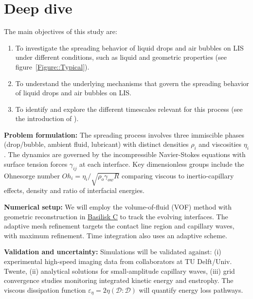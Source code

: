 \documentclass[11pt]{article}
\begin{document}
\section*{Deep dive}

The main objectives of this study are:

\begin{enumerate}
	\item To investigate the spreading behavior of liquid drops and air bubbles on LIS under different conditions, such as liquid and geometric properties (see figure~\ref{Figure::Typical}). 
	\item To understand the underlying mechanisms that govern the spreading behavior of liquid drops and air bubbles on LIS. 
	\item To identify and explore the different timescales relevant for this process (see the introduction of \citet{VatsalThesis}).
\end{enumerate}

\noindent \textbf{Problem formulation:} The spreading process involves three immiscible phases (drop/bubble, ambient fluid, lubricant) with distinct densities $\rho_i$ and viscosities $\eta_i$. The dynamics are governed by the incompressible Navier-Stokes equations with surface tension forces $\gamma_{ij}$ at each interface. Key dimensionless groups include the Ohnesorge number $Oh_i = \eta_i/\sqrt{\rho_o\gamma_{ow}R}$ comparing viscous to inertio-capillary effects, density and ratio of interfacial energies. 

\noindent \textbf{Numerical setup:} We will employ the volume-of-fluid (VOF) method with geometric reconstruction in \href{https://github.com/comphy-lab/Bubble-at-Lubis}{Basilisk C} to track the evolving interfaces. The adaptive mesh refinement targets the contact line region and capillary waves, with maximum refinement. Time integration also uses an adaptive scheme.

\noindent \textbf{Validation and uncertainty:} Simulations will be validated against: (i) experimental high-speed imaging data from collaborators at TU Delft/Univ. Twente, (ii) analytical solutions for small-amplitude capillary waves, (iii) grid convergence studies monitoring integrated kinetic energy and enstrophy. The viscous dissipation function $\varepsilon_\eta = 2\eta\left(\boldsymbol{\mathcal{D}:\mathcal{D}}\right)$ will quantify energy loss pathways.
\end{document}
